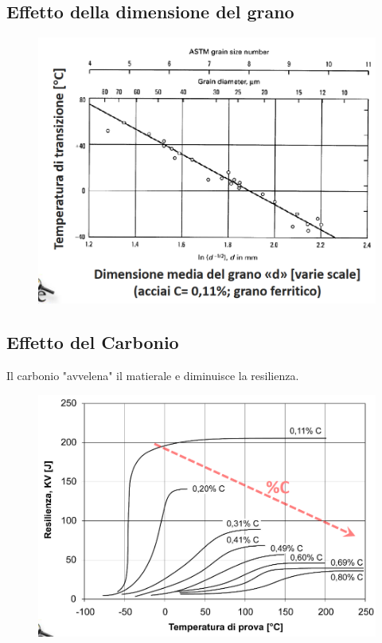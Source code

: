 \documentclass{article}
\begin{document}
{        \subsection{Effetto della dimensione del grano}
           \begin{figure}[!h]
                \centering
                \includegraphics[width=.85\linewidth]{Correllazione tra temperatura di transizione e dimensione del grano.png}
            \end{figure}
        \subsection{Effetto del Carbonio}
            Il carbonio "avvelena" il matierale e diminuisce la resilienza.
            \begin{figure}[!h]
                \centering
                \includegraphics[width=.85\linewidth]{Effetto del carbonio sulla resilienza del materiale.png}
            \end{figure}
}
\end{document}
